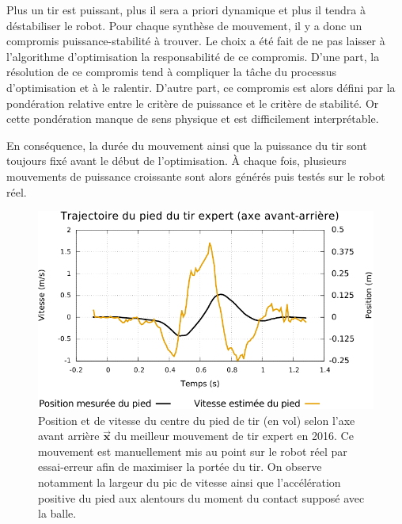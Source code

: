 Plus un tir est puissant, plus il sera a priori dynamique et
plus il tendra à déstabiliser le robot. Pour chaque synthèse de mouvement,
il y a donc un compromis puissance-stabilité à trouver.
Le choix a été fait de ne pas laisser à l'algorithme d'optimisation
la responsabilité de ce compromis.
D'une part, la résolution de ce compromis tend à compliquer la tâche 
du processus d'optimisation et à le ralentir.
D'autre part, ce compromis est alors défini par la pondération relative
entre le critère de puissance et le critère de stabilité.
Or cette pondération manque de sens physique et est difficilement interprétable.

En conséquence, la durée du mouvement ainsi que la puissance du tir sont
toujours fixé avant le début de l'optimisation.
À chaque fois, plusieurs mouvements de puissance 
croissante sont alors générés puis testés sur le robot réel.\\

\begin{figure}[htb]
    \begin{center}
        \includegraphics[type=pdf,ext=.pdf,read=.pdf,width=1.0\linewidth]{../plot/kickgreg_vel}
        \caption{\label{fig:kickgreg}
            Position et de vitesse du centre du pied de tir (en vol) 
            selon l'axe avant arrière $\bm{\vec{x}}$ 
            du meilleur mouvement de tir expert en 2016.
            Ce mouvement est manuellement mis au point sur le robot
            réel par essai-erreur afin de maximiser la portée du tir.
            On observe notamment la largeur du pic de vitesse ainsi
            que l'accélération positive du pied aux alentours du moment
            du contact supposé avec la balle.
        }
    \end{center}
\end{figure}

